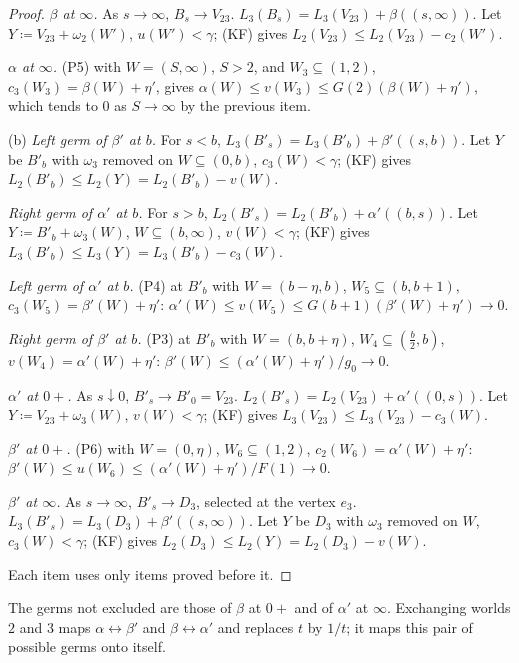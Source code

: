 \documentclass[11pt]{article}
\theoremstyle{definition}\newtheorem{definition}[theorem]{Definition}
\theoremstyle{remark}\newtheorem{remark}[theorem]{Remark}
\begin{document}
\begin{proof}
\emph{$\beta$ at $\infty$.} As $s\to\infty$, $B_s\to V_{23}$.
$L_3(B_s)=L_3(V_{23})+\beta((s,\infty))$. Let $Y\coloneqq
V_{23}+\omega_2(W')$, $u(W')<\gamma$; (KF) gives $L_2(V_{23})\le
L_2(V_{23})-c_2(W')$.

\emph{$\alpha$ at $\infty$.} (P5) with $W=(S,\infty)$, $S>2$, and
$W_3\subseteq(1,2)$, $c_3(W_3)=\beta(W)+\eta'$, gives $\alpha(W)\le
v(W_3)\le G(2)(\beta(W)+\eta')$, which tends to $0$ as $S\to\infty$ by the
previous item.

(b) \emph{Left germ of $\beta'$ at $b$.} For $s<b$,
$L_3(B'_s)=L_3(B'_b)+\beta'((s,b))$. Let $Y$ be $B'_b$ with $\omega_3$
removed on $W\subseteq(0,b)$, $c_3(W)<\gamma$; (KF) gives $L_2(B'_b)\le
L_2(Y)=L_2(B'_b)-v(W)$.

\emph{Right germ of $\alpha'$ at $b$.} For $s>b$,
$L_2(B'_s)=L_2(B'_b)+\alpha'((b,s))$. Let $Y\coloneqq B'_b+\omega_3(W)$,
$W\subseteq(b,\infty)$, $v(W)<\gamma$; (KF) gives $L_3(B'_b)\le L_3(Y)=
L_3(B'_b)-c_3(W)$.

\emph{Left germ of $\alpha'$ at $b$.} (P4) at $B'_b$ with $W=(b-\eta,b)$,
$W_5\subseteq(b,b+1)$, $c_3(W_5)=\beta'(W)+\eta'$: $\alpha'(W)\le v(W_5)\le
G(b+1)(\beta'(W)+\eta')\to0$.

\emph{Right germ of $\beta'$ at $b$.} (P3) at $B'_b$ with $W=(b,b+\eta)$,
$W_4\subseteq(\frac b2,b)$, $v(W_4)=\alpha'(W)+\eta'$: $\beta'(W)\le
(\alpha'(W)+\eta')/g_0\to0$.

\emph{$\alpha'$ at $0+$.} As $s\downarrow0$, $B'_s\to B'_0=V_{23}$.
$L_2(B'_s)=L_2(V_{23})+\alpha'((0,s))$. Let $Y\coloneqq V_{23}+\omega_3(W)$,
$v(W)<\gamma$; (KF) gives $L_3(V_{23})\le L_3(V_{23})-c_3(W)$.

\emph{$\beta'$ at $0+$.} (P6) with $W=(0,\eta)$, $W_6\subseteq(1,2)$,
$c_2(W_6)=\alpha'(W)+\eta'$: $\beta'(W)\le u(W_6)\le(\alpha'(W)+\eta')/F(1)
\to0$.

\emph{$\beta'$ at $\infty$.} As $s\to\infty$, $B'_s\to D_3$, selected at the
vertex $e_3$. $L_3(B'_s)=L_3(D_3)+\beta'((s,\infty))$. Let $Y$ be $D_3$ with
$\omega_3$ removed on $W$, $c_3(W)<\gamma$; (KF) gives $L_2(D_3)\le
L_2(Y)=L_2(D_3)-v(W)$.

Each item uses only items proved before it.
\end{proof}

The germs not excluded are those of $\beta$ at $0+$ and of $\alpha'$ at
$\infty$. Exchanging worlds $2$ and $3$ maps $\alpha\leftrightarrow\beta'$
and $\beta\leftrightarrow\alpha'$ and replaces $t$ by $1/t$; it maps this
pair of possible germs onto itself.
\end{document}
